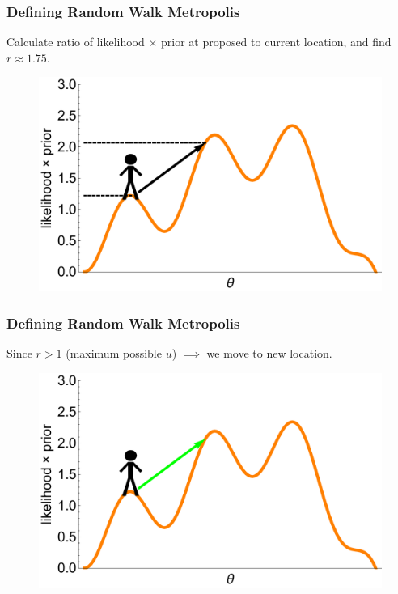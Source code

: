 \documentclass[handout]{beamer}
\begin{document}
\begin{frame}
\frametitle{Defining Random Walk Metropolis}
Calculate ratio of likelihood $\times$ prior at proposed to current location, and find $r \approx 1.75$.

\begin{figure}[ht]
\centerline{\includegraphics[width=1\textwidth]{animations_figures/lec4_metropolisDefinition7.pdf}}
\end{figure}

\end{frame}

\begin{frame}
\frametitle{Defining Random Walk Metropolis}
Since $r > 1$ (maximum possible $u$) $\implies$ we move to new location.

\begin{figure}[ht]
\centerline{\includegraphics[width=1\textwidth]{animations_figures/lec4_metropolisDefinition8.pdf}}
\end{figure}

\end{frame}
\end{document}
